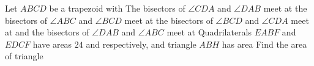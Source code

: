 Let $ABCD$ be a trapezoid with   The bisectors of $\angle CDA$ and $\angle DAB$ meet at  the bisectors of $\angle ABC$ and $\angle BCD$ meet at  the bisectors of $\angle BCD$ and $\angle CDA$ meet at  and the bisectors of $\angle DAB$ and $\angle ABC$ meet at   Quadrilaterals $EABF$ and $EDCF$ have areas $24$ and  respectively, and triangle $ABH$ has area   Find the area of triangle 